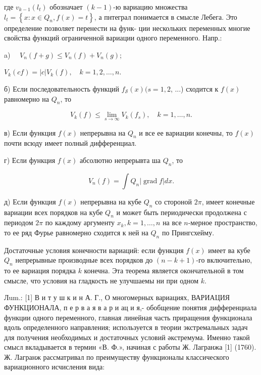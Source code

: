 \documentclass[10pt]{article}
\begin{document}
где $v_{k-1}\left(l_{t}\right)$ обозначает $(k-1)$-ю вариацию множества $l_{t}=\left\{x: x \in Q_{n}, f(x)=t\right\}$, а пнтеграл понимается в смысле Лебега. Это определение позволяет перенести на функ- ции нескольких переменных многие свойства функций ограниченной вариации одного переменного. Напр.:



a) $\quad V_{n}(f+g) \leqslant V_{n}(f)+V_{n}(g)$;



$V_{k}(c f)=|c| V_{k}(f), \quad k=1,2, \ldots, n$.



б) Если последовательность функций $f_{\mathcal{S}}(x)(s=1,2$, ...) сходится к $f(x)$ равномерно на $Q_{n}$, то



\[

V_{k}(f) \leqslant \lim _{s \rightarrow \infty} V_{k}\left(f_{s}\right), \quad k=1, \ldots, n .

\]



в) Если функция $f(x)$ непрерывна на $Q_{n}$ и все ее вариации конечны, то $f(x)$ почти всюду имеет полный дифференциал.



г) Если функция $f(x)$ абсолютно непрерывта ша $Q_{n}$, то



\[

V_{n}(f)=\int Q_{n}|\operatorname{grad} f| d x .

\]



д) Если функция $f(x)$ непрерывна на кубе $Q_{n}$ со стороной $2 \pi$, имеет конечные вариации всех порядков на кубе $Q_{n}$ и может быть периодически продолжена с периодом $2 \pi$ по каждому аргументу $x_{k}, k=1, \ldots, n$ на все $n$-мерное пространство, то ее ряд Фурье равномерно сходится к ней на $Q_{n}$ по Прингсхейму.



Достаточные условия конечности вариаций: если функция $f(x)$ имеет ва кубе $Q_{n}$ непрерывные производные всех порядков до $(n-k+1)$-го включительно, то ее вариация порядка $k$ конечна. Эта теорема является окончательной в том смысле, что условия на гладкость не улучшаемы ни при одном $k$.



Лum.: [1] В и т у ш к и н А. Г., О многомерных вариациях, ВАРИАЦИЯ ФУНКЦИОНАЛА, п е р в а я в а р и ац и я,- обобщение понятия дифференциала функции одного переменного, главная линейная часть приращения функционала вдоль определенного направления; используется в теории экстремальных задач для получения необходимых и достаточных условий әкстремума. Именно такой смысл вкладывается в термин «В. Ф.», начиная с работы Ж. Лагранжа [1] (1760). Ж. Лагранж рассматривал по преимуществу функционалы классического вариационного исчисления вида:
\end{document}
